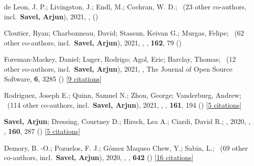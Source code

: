 \item[{\color{numcolor}\scriptsize6}] de Leon, J. P.; Livingston, J.; Endl, M.; Cochran, W. D.; \etal\ ({23} other co-authors, incl.\ \textbf{Savel, Arjun}), 2021, , \mnras ()

\item[{\color{numcolor}\scriptsize5}] Cloutier, Ryan; Charbonneau, David; Stassun, Keivan G.; Murgas, Felipe; \etal\ ({62} other co-authors, incl.\ \textbf{Savel, Arjun}), 2021, , \aj, \textbf{162}, 79 ()

\item[{\color{numcolor}\scriptsize4}] Foreman-Mackey, Daniel; Luger, Rodrigo; Agol, Eric; Barclay, Thomas; \etal\ ({12} other co-authors, incl.\ \textbf{Savel, Arjun}), 2021, , The Journal of Open Source Software, \textbf{6}, 3285 () [\href{https://ui.adsabs.harvard.edu/abs/2021JOSS....6.3285F}{9 citations}]

\item[{\color{numcolor}\scriptsize3}] Rodriguez, Joseph E.; Quinn, Samuel N.; Zhou, George; Vanderburg, Andrew; \etal\ ({114} other co-authors, incl.\ \textbf{Savel, Arjun}), 2021, , \aj, \textbf{161}, 194 () [\href{https://ui.adsabs.harvard.edu/abs/2021AJ....161..194R}{5 citations}]

\item[{\color{numcolor}\scriptsize2}] \textbf{Savel, Arjun}; Dressing, Courtney D.; Hirsch, Lea A.; Ciardi, David R.; \etal, 2020, , \aj, \textbf{160}, 287 () [\href{https://ui.adsabs.harvard.edu/abs/2020AJ....160..287S}{5 citations}]

\item[{\color{numcolor}\scriptsize1}] Demory, B. -O.; Pozuelos, F. J.; G{\'o}mez Maqueo Chew, Y.; Sabin, L.; \etal\ ({69} other co-authors, incl.\ \textbf{Savel, Arjun}), 2020, , \aanda, \textbf{642} () [\href{https://ui.adsabs.harvard.edu/abs/2020A&A...642A..49D}{16 citations}]